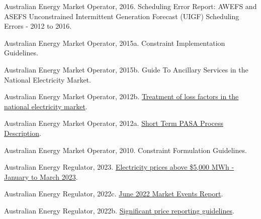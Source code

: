 \documentclass[12pt,a4paper,]{report}
\newlength{\cslhangindent}
\newenvironment{CSLReferences}[2] %
 {%
  \setlength{\parindent}{0pt}
  \ifodd #1 \everypar{\setlength{\hangindent}{\cslhangindent}}\ignorespaces\fi
  \ifnum #2 > 0
  \setlength{\parskip}{#2\baselineskip}
  \fi
 }%
 {}
\begin{document}
\begin{CSLReferences}{1}{0}
\leavevmode{}%
Australian Energy Market Operator, 2016. Scheduling {Error Report}:
{AWEFS} and {ASEFS Unconstrained Intermittent Generation Forecast}
({UIGF}) {Scheduling Errors} - 2012 to 2016.

\leavevmode{}%
Australian Energy Market Operator, 2015a. Constraint {Implementation
Guidelines}.

\leavevmode{}%
Australian Energy Market Operator, 2015b. Guide {To Ancillary Services}
in the {National Electricity Market}.

\leavevmode{}%
Australian Energy Market Operator, 2012b.
\href{https://www.aemo.com.au/Electricity/National-Electricity-Market-NEM/Security-and-reliability/-/media/93BB87A6E1F141DBB7B0D02AFD902D4F.ashx}{Treatment
of loss factors in the national electricity market}.

\leavevmode{}%
Australian Energy Market Operator, 2012a.
\href{https://www.aemo.com.au/-/media/files/electricity/nem/planning_and_forecasting/pasa/stpasa-process-description.pdf}{Short
{Term PASA Process Description}}.

\leavevmode{}%
Australian Energy Market Operator, 2010. Constraint {Formulation
Guidelines}.

\leavevmode{}%
Australian Energy Regulator, 2023.
\href{https://www.aer.gov.au/system/files/AER\%20-\%20Electricity\%20prices\%20above\%20\%245\%2C000\%20MWh\%20-\%20January\%20to\%20March\%202023_1.pdf}{Electricity
prices above \$5,000 {MWh} - {January} to {March} 2023}.

\leavevmode{}%
Australian Energy Regulator, 2022c.
\href{https://www.aer.gov.au/system/files/AER\%20June\%202022\%20Market\%20Events\%20Report-\%20FINAL\%20VERSION\%20-\%2014\%20December\%202022.pdf}{June
2022 {Market Events Report}}.

\leavevmode{}%
Australian Energy Regulator, 2022b.
\href{https://www.aer.gov.au/system/files/AER\%20-\%20Significant\%20Price\%20Reporting\%20Guidelines\%20-\%20September\%202022_0.pdf}{Significant
price reporting guidelines}.


\end{CSLReferences}
\end{document}
